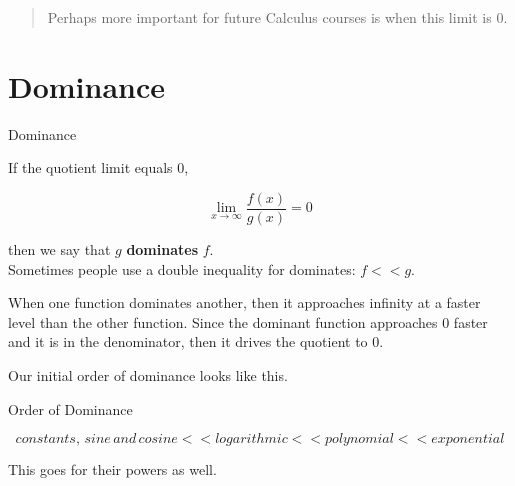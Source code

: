 \documentclass{ximera}
\begin{document}
\begin{quote}

Perhaps more important for future Calculus courses is when this limit is $0$. \\

\end{quote}















\section{Dominance}



\begin{definition}  Dominance

If the quotient limit equals $0$,

\[  \lim_{x \to \infty} \frac{f(x)}{g(x)}  = 0\]

then we say that $g$ \textbf{dominates} $f$. \\



Sometimes people use a double inequality for dominates:  $f << g$.\\

\end{definition}



When one function dominates another, then it approaches infinity at a faster level than the other function.  Since the dominant function approaches $0$ faster and it is in the denominator, then it drives the quotient to $0$.


Our initial order of dominance looks like this. \\


\begin{summary} Order of Dominance


\[   constants, \, sine \, and \, cosine << logarithmic << polynomial <<  exponential  \]



This goes for their powers as well.


\end{summary}
\end{document}

